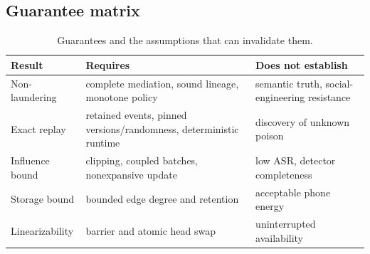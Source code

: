 \subsection{Guarantee matrix}

\begin{table}[h]
\centering
\small
\caption{Guarantees and the assumptions that can invalidate them.}
\begin{tabularx}{\linewidth}{lXX}
\toprule
Result & Requires & Does not establish \\
\midrule
Non-laundering & complete mediation, sound lineage, monotone policy & semantic truth, social-engineering resistance \\
Exact replay & retained events, pinned versions/randomness, deterministic runtime & discovery of unknown poison \\
Influence bound & clipping, coupled batches, nonexpansive update & low ASR, detector completeness \\
Storage bound & bounded edge degree and retention & acceptable phone energy \\
Linearizability & barrier and atomic head swap & uninterrupted availability \\
\bottomrule
\end{tabularx}
\end{table}
